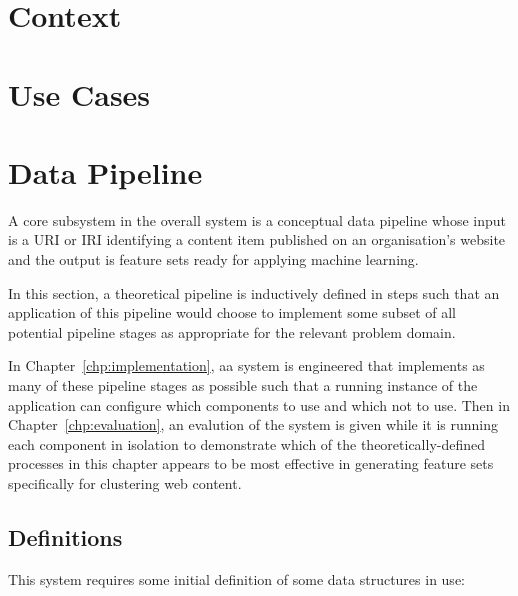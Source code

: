 \documentclass[10pt,a4paper]{report}
\begin{document}
\section{Context}

\section{Use Cases}

\section{Data Pipeline}

A core subsystem in the overall system is a conceptual data pipeline whose
input is a URI or IRI identifying a content item published on an organisation's
website and the output is feature sets ready for applying machine learning.

In this section, a theoretical pipeline is inductively defined in steps such
that an application of this pipeline would choose to implement some subset of
all potential pipeline stages as appropriate for the relevant problem domain.

In Chapter~\ref{chp:implementation}, aa system is engineered that implements
as many of these pipeline stages as possible such that a running instance of
the application can configure which components to use and which not to use.
Then in Chapter~\ref{chp:evaluation}, an evalution of the system is given
while it is running each component in isolation to demonstrate which of the
theoretically-defined processes in this chapter appears to be most effective
in generating feature sets specifically for clustering web content.

\subsection{Definitions}

This system requires some initial definition of some data structures in use:
\end{document}
